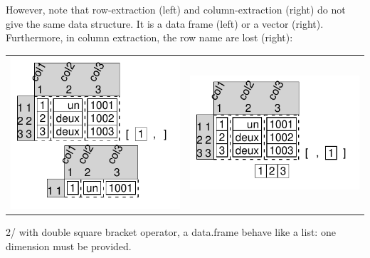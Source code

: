 \documentclass[pdflatex]{article}
\begin{document}
However, note that row-extraction (left) and column-extraction (right) do not
give the same data structure. It is a data frame (left) or a vector (right).
Furthermore, in column extraction, the row name are lost (right):

\begin{tabular}{cc}
\includegraphics{dataframe_extracting_row.pdf} & \includegraphics{dataframe_extracting_column.pdf}
\end{tabular}

2/ with double square bracket operator, a data.frame behave like a list: one dimension must be provided.
\end{document}
